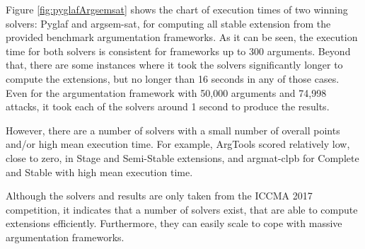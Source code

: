 Figure \ref{fig:pyglafArgsemsat} shows the chart of execution times of two winning solvers: Pyglaf and argsem-sat, for computing all stable extension from the provided benchmark argumentation frameworks. As it can be seen, the execution time for both solvers is consistent for frameworks up to 300 arguments. Beyond that, there are some instances where it took the solvers significantly longer to compute the extensions, but no longer than 16 seconds in any of those cases. Even for the argumentation framework with 50,000 arguments and 74,998 attacks, it took each of the solvers around 1 second to produce the results. 

However, there are a number of solvers with a small number of overall points and/or high mean execution time. For example, ArgTools \citep{argtools} scored relatively low, close to zero, in Stage and Semi-Stable extensions, and argmat-clpb for Complete and Stable with high mean execution time. 

Although the solvers and results are only taken from the ICCMA 2017 competition, it indicates that a number of solvers exist, that are able to compute extensions efficiently. Furthermore, they can easily scale to cope with massive argumentation frameworks. 